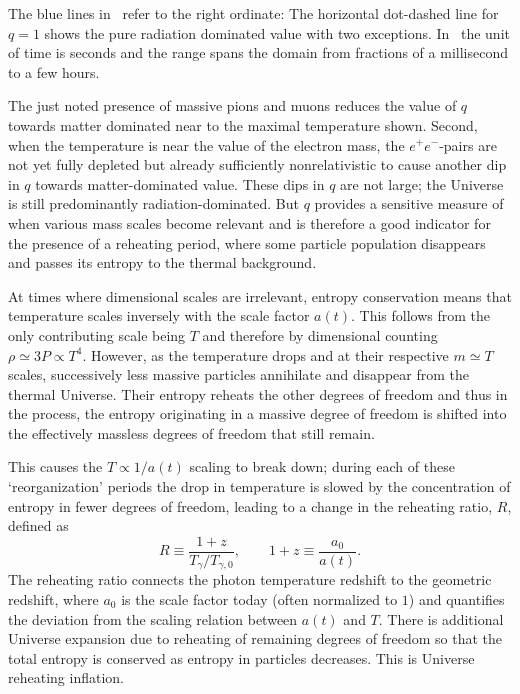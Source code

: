 The blue lines in~ refer to the right ordinate: The horizontal dot-dashed line for $q=1$ shows the pure radiation dominated value with two exceptions. In~ the unit of time is seconds and the range spans the domain from fractions of a millisecond to a few hours.

The just noted presence of massive pions and muons reduces the value of $q$ towards matter dominated near to the maximal temperature shown. Second, when the temperature is near the value of the electron mass, the $e^+e^-$-pairs are not yet fully depleted but already sufficiently nonrelativistic to cause another dip in $q$ towards matter-dominated value. These dips in $q$ are not large; the Universe is still predominantly radiation-dominated. But $q$ provides a sensitive measure of when various mass scales become relevant and is therefore a good indicator for the presence of a reheating period, where some particle population disappears and passes its entropy to the thermal background.

At times where dimensional scales are irrelevant, entropy conservation means that temperature scales inversely with the scale factor $a(t)$. This follows from the only contributing scale being $T$ and therefore by dimensional counting $ \rho\simeq 3P \propto T^4$. However, as the temperature drops and at their respective $m\simeq T$ scales, successively less massive particles annihilate and disappear from the thermal Universe. Their entropy reheats the other degrees of freedom and thus in the process, the entropy originating in a massive degree of freedom is shifted into the effectively massless degrees of freedom that still remain. 

This causes the $T\propto 1/a(t)$ scaling to break down; during each of these `reorganization' periods the drop in temperature is slowed by the concentration of entropy in fewer degrees of freedom, leading to a change in the reheating ratio, $R$, defined as
\begin{equation}\label{redshiftratio}
R\equiv \frac{1+z}{ T_\gamma/T_{\gamma,0}}, \qquad 1+z\equiv \frac{a_{0}}{a(t)}.
\end{equation}
The reheating ratio connects the photon temperature redshift to the geometric redshift, where $a_0$ is the scale factor today (often normalized to $1$) and quantifies the deviation from the scaling relation between $a(t)$ and $T$. There is additional Universe expansion due to reheating of remaining degrees of freedom so that the total entropy is conserved as entropy in particles decreases. This is Universe reheating inflation.


